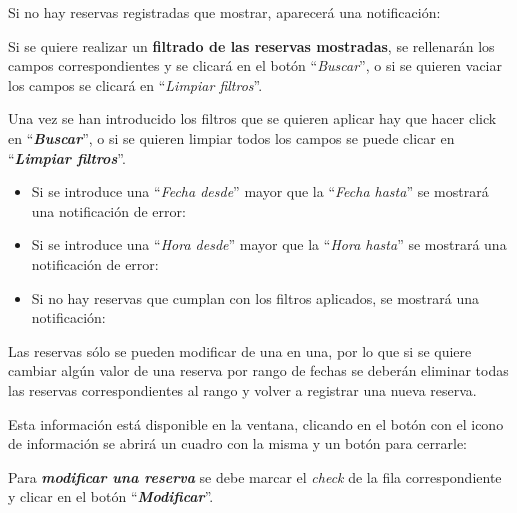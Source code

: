 Si no hay reservas registradas que mostrar, aparecerá una notificación:


Si se quiere realizar un \textbf{filtrado de las reservas mostradas}, se rellenarán los campos correspondientes y se clicará en el botón ``\textit{Buscar}'', o si se quieren vaciar los campos se clicará en ``\textit{Limpiar filtros}''.

Una vez se han introducido los filtros que se quieren aplicar hay que hacer click en ``\textbf{\textit{Buscar}}'', o si se quieren limpiar todos los campos se puede clicar en ``\textbf{\textit{Limpiar filtros}}''.

\begin{itemize}
    \item Si se introduce una ``\textit{Fecha desde}'' mayor que la ``\textit{Fecha hasta}'' se mostrará una notificación de error:
    
    
    \item Si se introduce una ``\textit{Hora desde}'' mayor que la ``\textit{Hora hasta}'' se mostrará una notificación de error:
    
    
    \item Si no hay reservas que cumplan con los filtros aplicados, se mostrará una notificación:
    
\end{itemize}

Las reservas sólo se pueden modificar de una en una, por lo que si se quiere cambiar algún valor de una reserva por rango de fechas se deberán eliminar todas las reservas correspondientes al rango y volver a registrar una nueva reserva. 

Esta información está disponible en la ventana, clicando en el botón con el icono de información se abrirá un cuadro con la misma y un botón para cerrarle:


Para \textbf{\textit{modificar una reserva}} se debe marcar el \textit{check} de la fila correspondiente y clicar en el botón ``\textbf{\textit{Modificar}}''.

